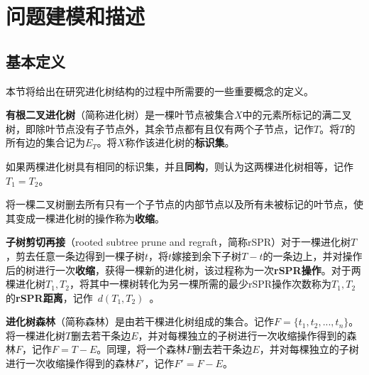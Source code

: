 
\chapter{问题建模和描述}
\section{基本定义}
本节将给出在研究进化树结构的过程中所需要的一些重要概念的定义。

\begin{dingyi}
\textbf{有根二叉进化树}（简称进化树）是一棵叶节点被集合$X$中的元素所标记的满二叉树，即除叶节点没有子节点外，其余节点都有且仅有两个子节点，记作$T$。将$T$的所有边的集合记为$E_T$。将\textbf{$X$}称作该进化树的\textbf{标识集}。
\end{dingyi}

\begin{dingyi}
如果两棵进化树具有相同的标识集，并且\textbf{同构}，则认为这两棵进化树相等，记作\textbf{$T_1 = T_2$}。
\end{dingyi}

\begin{dingyi}
将一棵二叉树删去所有只有一个子节点的内部节点以及所有未被标记的叶节点，使其变成一棵进化树的操作称为\textbf{收缩}。
\end{dingyi}

\begin{dingyi}
\textbf{子树剪切再接}（rooted subtree prune and regraft，简称rSPR）对于一棵进化树$T$，剪去任意一条边得到一棵子树$t$，将$t$嫁接到余下子树$T-t$的一条边上，并对操作后的树进行一次\textbf{收缩}，获得一棵新的进化树，该过程称为一次\textbf{rSPR操作}。对于两棵进化树$T_1,T_2$，将其中一棵树转化为另一棵所需的最少rSPR操作次数称为$T_1,T_2$的\textbf{rSPR距离}，记作~$d(T_1,T_2)$~。
\end{dingyi}

\begin{dingyi}
\textbf{进化树森林}（简称森林）是由若干棵进化树组成的集合。记作$F=\{t_1,t_2,...,t_n\}$。将一棵进化树$T$删去若干条边$E$，并对每棵独立的子树进行一次收缩操作得到的森林$F$，记作\textbf{$F=T-E$}。同理，将一个森林$F$删去若干条边$E$，并对每棵独立的子树进行一次收缩操作得到的森林$F'$，记作\textbf{$F'=F-E$}。
\end{dingyi}
\clearpage

